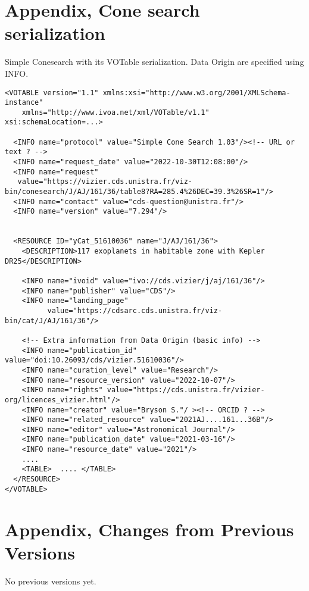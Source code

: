 \documentclass[11pt,a4paper]{ivoa}
\begin{document}
\section{Appendix, Cone search serialization}\label{appendixA}
Simple Conesearch with its VOTable serialization. Data Origin are specified using  INFO.
\begin{verbatim}
<VOTABLE version="1.1" xmlns:xsi="http://www.w3.org/2001/XMLSchema-instance"
    xmlns="http://www.ivoa.net/xml/VOTable/v1.1" xsi:schemaLocation=...>

  <INFO name="protocol" value="Simple Cone Search 1.03"/><!-- URL or text ? -->
  <INFO name="request_date" value="2022-10-30T12:08:00"/>
  <INFO name="request"
   value="https://vizier.cds.unistra.fr/viz-bin/conesearch/J/AJ/161/36/table8?RA=285.4%26DEC=39.3%26SR=1"/>
  <INFO name="contact" value="cds-question@unistra.fr"/>
  <INFO name="version" value="7.294"/>


  <RESOURCE ID="yCat_51610036" name="J/AJ/161/36">
    <DESCRIPTION>117 exoplanets in habitable zone with Kepler DR25</DESCRIPTION>

    <INFO name="ivoid" value="ivo://cds.vizier/j/aj/161/36"/>
    <INFO name="publisher" value="CDS"/>
    <INFO name="landing_page"
          value="https://cdsarc.cds.unistra.fr/viz-bin/cat/J/AJ/161/36"/>

    <!-- Extra information from Data Origin (basic info) -->
    <INFO name="publication_id" value="doi:10.26093/cds/vizier.51610036"/>
    <INFO name="curation_level" value="Research"/>
    <INFO name="resource_version" value="2022-10-07"/>
    <INFO name="rights" value="https://cds.unistra.fr/vizier-org/licences_vizier.html"/>
    <INFO name="creator" value="Bryson S."/ ><!-- ORCID ? -->
    <INFO name="related_resource" value="2021AJ....161...36B"/>
    <INFO name="editor" value="Astronomical Journal"/>
    <INFO name="publication_date" value="2021-03-16"/>
    <INFO name="resource_date" value="2021"/>
    ....
    <TABLE>  .... </TABLE>
  </RESOURCE>
</VOTABLE>
\end{verbatim}

\section{Appendix, Changes from Previous Versions}

No previous versions yet.



\end{document}
